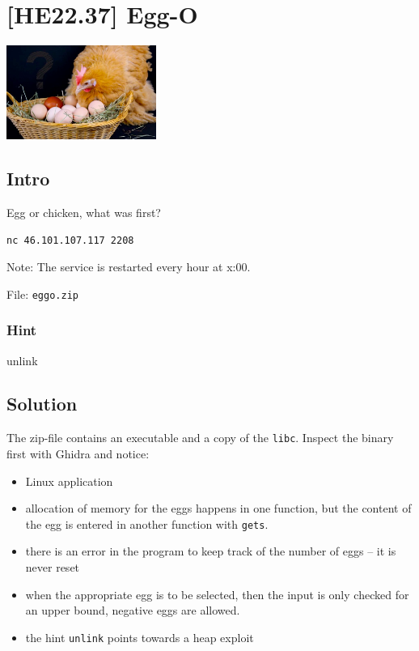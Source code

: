 
\hypertarget{he22.37}{%
\chapter{[HE22.37] Egg-O}\label{he22.37}}

\begin{marginfigure}
	\includegraphics[width=49mm]{level8/challenge37.jpg}
\end{marginfigure}
\section{Intro}
Egg or chicken, what was first?

\verb+nc 46.101.107.117 2208+

Note: The service is restarted every hour at x:00.

File: \verb+eggo.zip+

\subsection{Hint}
unlink

\section{Solution}\label{hv22.37solution}

The zip-file contains an executable and a copy of the \verb+libc+.  Inspect the
binary first with Ghidra and notice:
\begin{itemize}
\item Linux application
\item allocation of memory for the eggs happens in one function, but the
	content of the egg is entered in another function with \verb+gets+.
\item there is an error in the program to keep track of the number of eggs --
	it is never reset
\item when the appropriate egg is to be selected, then the input is only
	checked for an upper bound, negative eggs are allowed.
\item the hint \verb+unlink+ points towards a heap exploit
\end{itemize}

